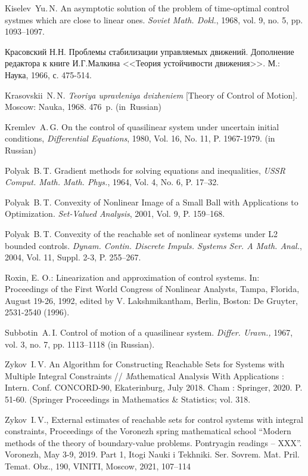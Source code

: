 \documentclass[../main.tex]{subfiles}
\begin{document}
\begin{thebibliography}{99}
Kiselev~Yu.\,N. An asymptotic solution of the problem of time-optimal control systmes which are close to
linear ones. \emph{Soviet Math. Dokl.}, 1968, vol. 9, no. 5, pp. 1093–1097.

Красовский Н.Н. Проблемы стабилизации управляемых движений. Дополнение редактора к книге И.Г.Малкина <<Теория устойчивости  движения>>. М.: Наука, 1966, с. 475-514.

{Krasovskii~N.\,N.} \emph{Teoriya upravleniya dvizheniem} [Theory of Control of Motion]. Moscow: Nauka, 1968. 476~p. (in~Russian)

Kremlev~A.\,G. On the control of quasilinear system under uncertain initial conditions, \emph{Differential Equations}, 1980, Vol. 16, No. 11, P. 1967-1979. (in Russian)

Polyak~B.\,T. Gradient methods for solving equations and inequalities, \emph{USSR Comput. Math. Math. Phys.}, 1964, Vol. 4, No. 6, P. 17–32.

Polyak~B.\,T. Convexity of Nonlinear Image of a Small Ball with Applications to Optimization. \emph{Set-Valued Analysis}, 2001, Vol. 9, P. 159–168.

Polyak~B.\,T. Convexity of the reachable set of nonlinear systems under L2 bounded controls. \emph{Dynam. Contin. Discrete Impuls. Systems Ser. A Math. Anal.}, 2004, Vol. 11, Suppl. 2-3,  P. 255–267.

Roxin, E. O.: Linearization and approximation of control systems. In: Proceedings of the First World Congress of Nonlinear Analysts, Tampa, Florida, August 19-26, 1992, edited by V. Lakshmikantham, Berlin, Boston: De Gruyter, 2531-2540 (1996). 

Subbotin~A.\,I. Control of motion of a quasilinear system. \emph{Differ. Uravn.,} 1967, vol. 3, no. 7, pp. 1113–1118
(in Russian).

Zykov~I.\,V. An Algorithm for Constructing Reachable Sets for Systems with Multiple Integral Constraints  // {\textit Mathematical Analysis With Applications : Intern. Conf. CONCORD-90}, Ekaterinburg, July 2018. Cham : Springer, 2020. P. 51-60. (Springer Proceedings in Mathematics \& Statistics; vol. 318. 

Zykov~I.\,V., External estimates of reachable sets for control systems with integral constraints, Proceedings of the Voronezh spring mathematical school “Modern methods of the theory of boundary-value problems. Pontryagin readings – XXX”. Voronezh, May 3-9, 2019. Part 1, Itogi Nauki i Tekhniki. Ser. Sovrem. Mat. Pril. Temat. Obz., 190, VINITI, Moscow, 2021, 107–114 



\end{thebibliography}
\end{document}
